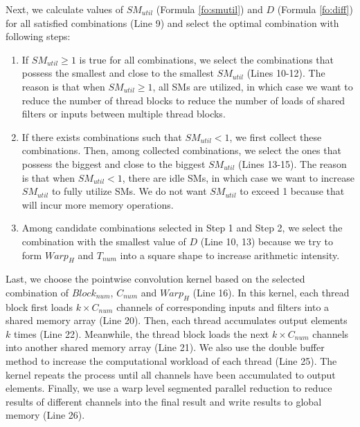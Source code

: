 Next, we calculate values of $SM_{util}$ (Formula \ref{fo:smutil}) and $D$ (Formula \ref{fo:diff}) for all satisfied combinations (Line 9) and select the optimal combination with following steps:
\begin{enumerate}[Step 1]
    \item If $SM_{util} \geq 1$ is true for all combinations, we select the combinations that possess the smallest and close to the smallest $SM_{util}$ (Lines 10-12).
    The reason is that when $SM_{util} \geq 1$, all SMs are utilized, in which case we want to reduce the number of thread blocks to reduce the number of loads of shared filters or inputs between multiple thread blocks.
    \item If there exists combinations such that $SM_{util}<1$, we first collect these combinations. Then, among collected combinations, we select the ones that possess the biggest and close to the biggest $SM_{util}$ (Lines 13-15).
    The reason is that when $SM_{util}<1$, there are idle SMs, in which case we want to increase $SM_{util}$ to fully utilize SMs. We do not want $SM_{util}$ to exceed 1 because that will incur more memory operations.
    \item Among candidate combinations selected in Step 1 and Step 2, we select the combination with the smallest value of $D$ (Line 10, 13) because we try to form $Warp_H$ and $T_{num}$ into a square shape to increase arithmetic intensity.
\end{enumerate}

Last, we choose the pointwise convolution kernel based on the selected combination of $Block_{num}$, $C_{num}$ and $Warp_H$ (Line 16).
In this kernel, each thread block first loads $k \times C_{num}$ channels of corresponding inputs and filters into a shared memory array (Line 20).
Then, each thread accumulates output elements $k$ times (Line 22).
Meanwhile, the thread block loads the next $k \times C_{num}$ channels into another shared memory array (Line 21).
We also use the double buffer method to increase the computational workload of each thread (Line 25).
The kernel repeats the process until all channels have been accumulated to output elements.
Finally, we use a warp level segmented parallel reduction to reduce results of different channels into the final result and write results to global memory (Line 26).
